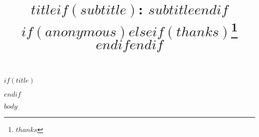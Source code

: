 \documentclass{scrartcl}
\begin{document}
$if(title)$
\title{$title$$if(subtitle)$: $subtitle$$endif$ $if(anonymous)$$else$$if(thanks)$\thanks{$thanks$} $endif$$endif$ }
$endif$

$body$
\end{document}
